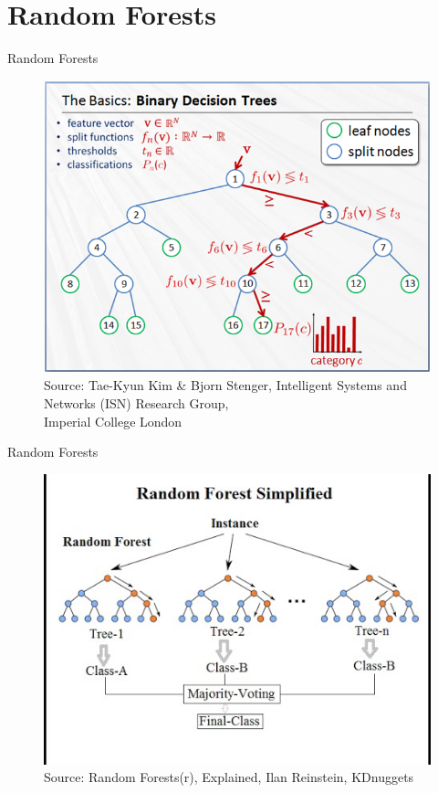 \documentclass{beamer}
\begin{document}
\section{Random Forests}

\begin{frame}{Random Forests \parencite{DBLP:journals/ml/Breiman01}}
  \begin{figure}
    \centering
    \includegraphics[scale=0.5]{random_forests_2.png} \\
    {\tiny\color{gray}Source: Tae-Kyun Kim \& Bjorn Stenger, Intelligent Systems and Networks (ISN) Research Group,\\[-7pt] Imperial College London}
  \end{figure}
\end{frame}

\begin{frame}{Random Forests \parencite{DBLP:journals/ml/Breiman01}}
  \begin{figure}
    \centering
    \includegraphics[scale=0.5]{rand-forest-1.jpg} \\
    {\tiny\color{gray}Source: Random Forests(r), Explained, Ilan Reinstein, KDnuggets}
  \end{figure}
\end{frame}
\end{document}
